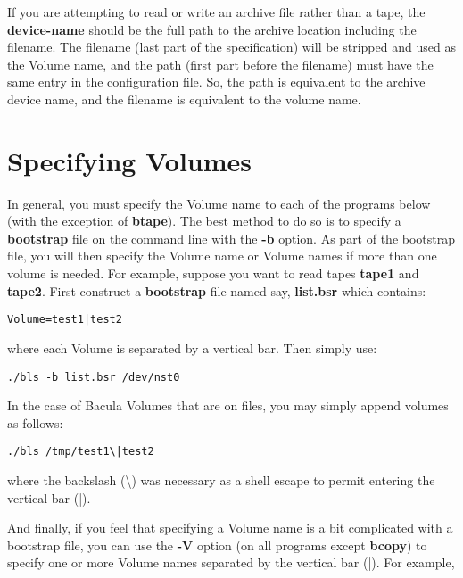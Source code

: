 If you are attempting to read or write an archive file rather than a tape, the
{\bf device-name} should be the full path to the archive location including
the filename. The filename (last part of the specification) will be stripped
and used as the Volume name, and the path (first part before the filename)
must have the same entry in the configuration file. So, the path is equivalent
to the archive device name, and the filename is equivalent to the volume name.


\section{Specifying Volumes}

In general, you must specify the Volume name to each of the programs below
(with the exception of {\bf btape}). The best method to do so is to specify a
{\bf bootstrap} file on the command line with the {\bf -b} option. As part of
the bootstrap file, you will then specify the Volume name or Volume names if
more than one volume is needed. For example, suppose you want to read tapes
{\bf tape1} and {\bf tape2}. First construct a {\bf bootstrap} file named say,
{\bf list.bsr} which contains:

\footnotesize
\begin{verbatim}
Volume=test1|test2
\end{verbatim}
\normalsize

where each Volume is separated by a vertical bar. Then simply use:

\footnotesize
\begin{verbatim}
./bls -b list.bsr /dev/nst0
\end{verbatim}
\normalsize

In the case of Bacula Volumes that are on files, you may simply append volumes
as follows:

\footnotesize
\begin{verbatim}
./bls /tmp/test1\|test2
\end{verbatim}
\normalsize

where the backslash (\textbackslash{}) was necessary as a shell escape to
permit entering the vertical bar (|).

And finally, if you feel that specifying a Volume name is a bit complicated
with a bootstrap file, you can use the {\bf -V} option (on all programs except
{\bf bcopy}) to specify one or more Volume names separated by the vertical bar
(|). For example,

